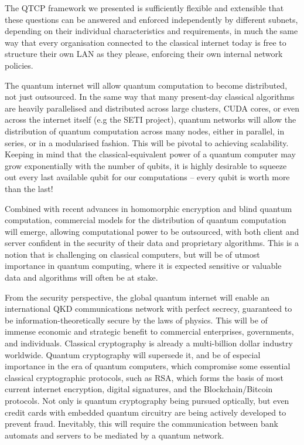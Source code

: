 The QTCP framework we presented is sufficiently flexible and extensible that these questions can be answered and enforced independently by different subnets, depending on their individual characteristics and requirements, in much the same way that every organisation connected to the classical internet today is free to structure their own LAN as they please, enforcing their own internal network policies.

The quantum internet will allow quantum computation to become distributed, not just outsourced. In the same way that many present-day classical algorithms are heavily parallelised and distributed across large clusters, CUDA cores, or even across the internet itself (e.g the SETI project), quantum networks will allow the distribution of quantum computation across many nodes, either in parallel, in series, or in a modularised fashion. This will be pivotal to achieving scalability. Keeping in mind that the classical-equivalent power of a quantum computer may grow exponentially with the number of qubits, it is highly desirable to squeeze out every last available qubit for our computations -- every qubit is worth more than the last!

Combined with recent advances in homomorphic encryption and blind quantum computation, commercial models for the distribution of quantum computation will emerge, allowing computational power to be outsourced, with both client and server confident in the security of their data and proprietary algorithms. This is a notion that is challenging on classical computers, but will be of utmost importance in quantum computing, where it is expected sensitive or valuable data and algorithms will often be at stake.

From the security perspective, the global quantum internet will enable an international QKD communications network with perfect secrecy, guaranteed to be information-theoretically secure by the laws of physics. This will be of immense economic and strategic benefit to commercial enterprises, governments, and individuals. Classical cryptography is already a multi-billion dollar industry worldwide. Quantum cryptography will supersede it, and be of especial importance in the era of quantum computers, which compromise some essential classical cryptographic protocols, such as RSA, which forms the basis of most current internet encryption, digital signatures, and the Blockchain/Bitcoin protocols. Not only is quantum cryptography being pursued optically, but even credit cards with embedded quantum circuitry are being actively developed to prevent fraud. Inevitably, this will require the communication between bank automats and servers to be mediated by a quantum network.

